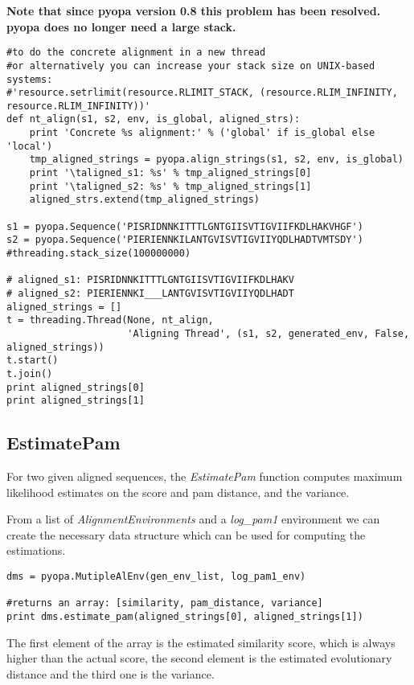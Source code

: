 \documentclass[12pt]{article}
\begin{document}
\textbf{Note that since pyopa version 0.8 this problem has been resolved. pyopa does no longer need a large stack.}

\begin{lstlisting}
#to do the concrete alignment in a new thread
#or alternatively you can increase your stack size on UNIX-based systems:
#'resource.setrlimit(resource.RLIMIT_STACK, (resource.RLIM_INFINITY, resource.RLIM_INFINITY))'
def nt_align(s1, s2, env, is_global, aligned_strs):
    print 'Concrete %s alignment:' % ('global' if is_global else 'local')
    tmp_aligned_strings = pyopa.align_strings(s1, s2, env, is_global)
    print '\taligned_s1: %s' % tmp_aligned_strings[0]
    print '\taligned_s2: %s' % tmp_aligned_strings[1]
    aligned_strs.extend(tmp_aligned_strings)

s1 = pyopa.Sequence('PISRIDNNKITTTLGNTGIISVTIGVIIFKDLHAKVHGF')
s2 = pyopa.Sequence('PIERIENNKILANTGVISVTIGVIIYQDLHADTVMTSDY')
#threading.stack_size(100000000)

# aligned_s1: PISRIDNNKITTTLGNTGIISVTIGVIIFKDLHAKV
# aligned_s2: PIERIENNKI___LANTGVISVTIGVIIYQDLHADT
aligned_strings = []
t = threading.Thread(None, nt_align,
                     'Aligning Thread', (s1, s2, generated_env, False, aligned_strings))
t.start()
t.join()
print aligned_strings[0]
print aligned_strings[1]
\end{lstlisting}

\subsection{EstimatePam}
\label{subsec:EPam}

For two given aligned sequences, the \emph{EstimatePam} function computes maximum likelihood estimates on the score and pam distance, and the variance. 

From a list of \emph{AlignmentEnvironments} and a \emph{log\_pam1} environment we can create the necessary data structure which can be used for computing the estimations.

\begin{lstlisting}
dms = pyopa.MutipleAlEnv(gen_env_list, log_pam1_env)

#returns an array: [similarity, pam_distance, variance]
print dms.estimate_pam(aligned_strings[0], aligned_strings[1])

\end{lstlisting}

The first element of the array is the estimated similarity score, which is always higher than the actual score, the second element is the estimated evolutionary distance and the third one is the variance.
\end{document}
